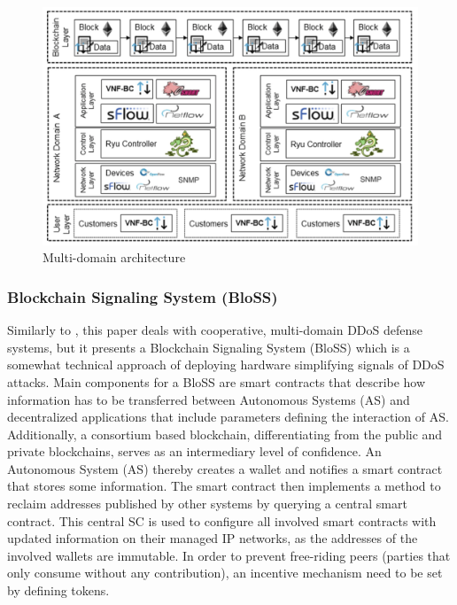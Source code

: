 \begin{figure}[ht]
  \begin{center}
  \includegraphics[scale=0.5]{Talk7/img/ddos/multi_domain}
  \end{center}
  \caption{Multi-domain architecture}
  \label{ddos_multi_domain_architecture}
\end{figure}


\subsubsection{Blockchain Signaling System (BloSS)}

Similarly to \cite{Rodrigues2017a}, this paper deals with cooperative, multi-domain DDoS defense systems, but it presents a Blockchain Signaling System (BloSS) which is a somewhat technical approach of deploying hardware simplifying signals of DDoS attacks. Main components for a BloSS are smart contracts that describe how information has to be transferred between Autonomous Systems (AS) and decentralized applications that include parameters defining the interaction of AS. Additionally, a consortium based blockchain, differentiating from the public and private blockchains, serves as an intermediary level of confidence. An Autonomous System (AS) thereby creates a wallet and notifies a smart contract that stores some information. The smart contract then implements a method to reclaim addresses published by other systems by querying a central smart contract. This central SC is used to configure all involved smart contracts with updated information on their managed IP networks, as the addresses of the involved wallets are immutable. In order to prevent free-riding peers (parties that only consume without any contribution), an incentive mechanism need to be set by defining tokens.  %

